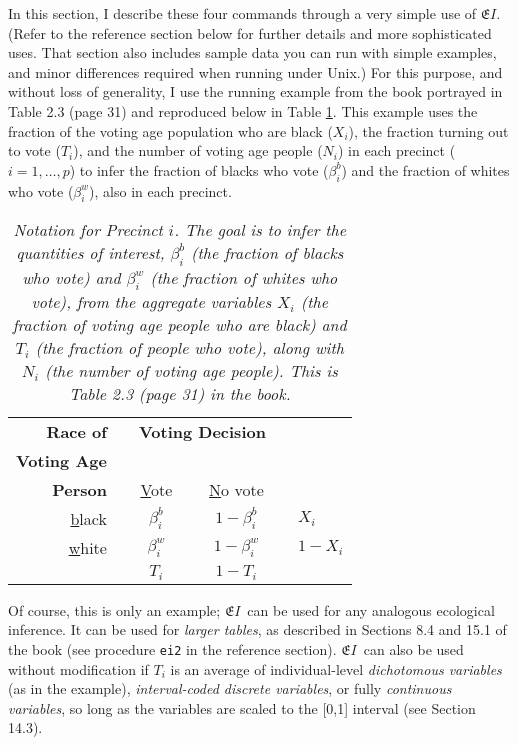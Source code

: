\documentclass[11pt,titlepage]{article}
\newcommand{\EI}{\ensuremath{{\mathfrak EI}}}
\newcommand{\Npp}{{N_i}}
\begin{document}
In this section, I describe these four commands through a very simple
use of \EI.  (Refer to the reference section below for further details
and more sophisticated uses.  That section also includes sample data
you can run with simple examples, and minor differences required when
running under Unix.)  For this purpose, and without loss of
generality, I use the running example from the book portrayed in Table
2.3 (page 31) and reproduced below in Table \ref{t:snotEI}.  This
example uses the fraction of the voting age population who are black
($X_i$), the fraction turning out to vote ($T_i$), and the number of
voting age people ($\Npp$) in each precinct ($i=1,\ldots,p$) to infer
the fraction of blacks who vote ($\beta_i^b$) and the fraction of
whites who vote ($\beta_i^w$), also in each precinct.
\begin{table}[t]
  \begin{center}
    \leavevmode
    \setlength{\extrarowheight}{4pt}
    \begin{tabular}{r<{  }@{}r@{}c@{}l@{}c@{}c@{}>{  }l}
      \textbf{Race of}&&\multicolumn{3}{c}{\textbf{Voting Decision}}\\
      \textbf{Voting Age} && &                   &&\\
      \textbf{Person} && \multicolumn{1}{c}{\underline{V}ote} && \underline{N}o vote &  \\\cline{2-5}
      \underline{b}lack &\vline& $\beta^b_i$ &\vline& $1-\beta_i^b$ &\vline& $X_i$ \\
      \cline{2-5}
      \underline{w}hite &\vline& $\beta^w_i$ &\vline& $1-\beta_i^w$ &\vline&$1-X_i$\\ \cline{2-5}
      && $T_i$       &&       $1-T_i$  && \\
    \end{tabular}
    \caption[Simplified Notation for Precinct $i$]{\em  Notation
      for Precinct $i$.  The goal is to infer the quantities of interest,
      $\beta_i^b$ (the fraction of blacks who vote) and $\beta_i^w$ (the
      fraction of whites who vote), from the aggregate variables $X_i$
      (the fraction of voting age people who are black) and $T_i$ (the
      fraction of people who vote), along with $\Npp$ (the number of
      voting age people).  This is Table 2.3 (page 31) in the book.}
    \label{t:snotEI}
  \end{center}
\end{table}

Of course, this is only an example; \EI\ can be used for any analogous
ecological inference.  It can be used for \emph{larger tables}, as
described in Sections 8.4 and 15.1 of the book (see procedure
\texttt{ei2} in the reference section).  \EI\ can also be used without
modification if $T_i$ is an average of individual-level
\emph{dichotomous variables} (as in the example), \emph{interval-coded
  discrete variables}, or fully \emph{continuous variables}, so long
as the variables are scaled to the [0,1] interval (see Section 14.3).
\end{document}
